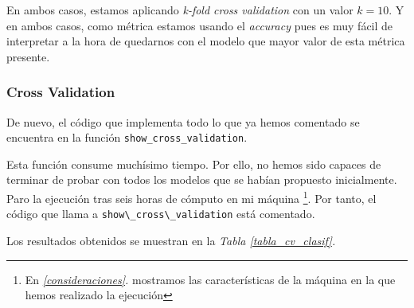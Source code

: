 \documentclass[11pt]{article}
\begin{document}
En ambos casos, estamos aplicando \emph{k-fold cross validation} con un valor $k = 10$. Y en ambos casos, como métrica estamos usando el \emph{accuracy} pues es muy fácil de interpretar a la hora de quedarnos con el modelo que mayor valor de esta métrica presente.

\subsubsection{Cross Validation}

De nuevo, el código que implementa todo lo que ya hemos comentado se encuentra en la función \lstinline{show_cross_validation}.

Esta función consume muchísimo tiempo. Por ello, no hemos sido capaces de terminar de probar con todos los modelos que se habían propuesto inicialmente. Paro la ejecución tras seis horas de cómputo en mi máquina \footnote{En \emph{\ref{consideraciones}. } mostramos las características de la máquina en la que hemos realizado la ejecución}. Por tanto, el código que llama a \lstinline{show\_cross\_validation} está comentado.


Los resultados obtenidos se muestran en la \emph{Tabla \ref{tabla_cv_clasif}. }
\end{document}
